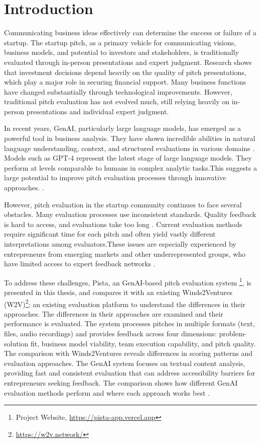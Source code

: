 \chapter{Introduction}

\label{ch:introduction}

Communicating business ideas effectively can determine the success or failure of a startup. The startup pitch, as a primary vehicle for communicating visions, business models, and potential to investors and stakeholders, is traditionally evaluated through in-person presentations and expert judgment.  Research shows that investment decisions depend heavily on the quality of pitch presentations, which play a major role in securing financial support\cite{masterpresentat}. Many business functions have changed substantially through technological improvements. However, traditional pitch evaluation has not evolved much, still relying heavily on in-person presentations and individual expert judgment.

In recent years, GenAI, particularly large language models, has emerged as a powerful tool in business analysis. They have shown incredible abilities in natural language understanding, context, and structured evaluations in various domains \cite{Ozince2024}. Models such as GPT-4 represent the latest stage of large language models. They perform at levels comparable to humans in complex analytic tasks.This suggests a large potential to improve pitch evaluation processes through innovative approaches. \cite{gpt}.

However, pitch evaluation in the startup community continues to face several obstacles. Many evaluation processes use inconsistent standards. Quality feedback is hard to access, and evaluations take too long \cite{StartupEvaluati, Kalvapalle2024}. Current evaluation methods require significant time for each pitch and often yield vastly different interpretations among evaluators.These issues are especially experienced by entrepreneurs from emerging markets and other underrepresented groups, who have limited access to expert feedback networks \cite{BreakingBarrier}.

To address these challenges, Pista, an GenAI-based pitch evaluation system \footnote{Project Website, \url{https://pista-app.vercel.app}}, is presented in this thesis, and compares it with an existing Winds2Ventures (W2V)\footnote{\url{https://w2v.network/}}; an existing evaluation platform to understand the differences in their approaches.
The differences in their approaches are examined and their performance is evaluated. The system processes pitches in multiple formats (text, files, audio recordings) and provides feedback across four dimensions: problem-solution fit, business model viability, team execution capability, and pitch quality. The comparison with Winds2Ventures reveals differences in scoring patterns and evaluation approaches.
The GenAI system focuses on textual content analysis, providing fast and consistent evaluation that can address accessibility barriers for entrepreneurs seeking feedback.  The comparison shows how different GenAI evaluation methods perform and where each approach works best \cite{TheFutureofAIEv}.

